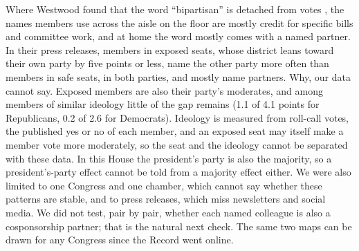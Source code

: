 \documentclass[9pt,twocolumn,twoside]{pnas-new}
\begin{document}
Where Westwood found that the word ``bipartisan'' is detached from votes \cite{westwood2022}, the names members use
across the aisle on the floor are mostly credit for specific bills and committee work, and at home the word mostly
comes with a named partner. In their press releases, members in exposed seats, whose district leans toward their own
party by five points or less, name the other party more often than members in safe seats, in both parties, and
mostly name partners. Why, our data cannot say. Exposed members are also their party's moderates, and among members of
similar ideology little of the gap remains (1.1 of 4.1 points for Republicans, 0.2 of 2.6 for Democrats). Ideology
is measured from roll-call votes, the published yes or no of each member, and an exposed seat may itself make a member
vote more moderately, so the seat and the ideology cannot be separated with these data. In this House the president's
party is also the majority, so a president's-party effect cannot be told from a majority effect either. We were also limited to one Congress and one
chamber, which cannot say whether these patterns are stable, and to press releases, which miss newsletters and social
media. We did not test, pair by pair, whether each named colleague is also a cosponsorship partner; that is the
natural next check. The same two maps can be drawn for any Congress since the Record went online.
\end{document}
